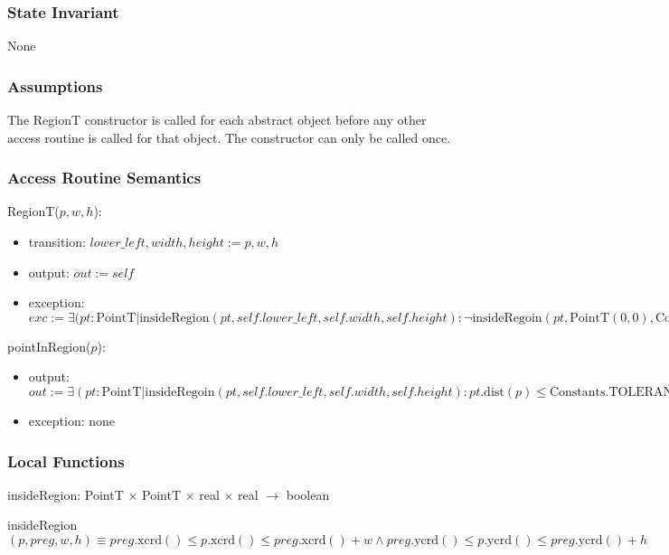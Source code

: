 \documentclass[12pt]{article}
\begin{document}
\subsubsection* {State Invariant}
None

\subsubsection* {Assumptions}
The RegionT constructor is called for each abstract object before any other access routine is called for that
object.  The constructor can only be called once.

\subsubsection* {Access Routine Semantics}

\noindent RegionT($p, w, h$):
\begin{itemize}
\item transition: $\mathit{lower\_left}, \mathit{width}, \mathit{height} := p, w, h$
\item output: $out := \mathit{self}$
\item exception: $exc := \exists ( pt: \mbox{PointT} | \mbox{insideRegion}(pt,self.lower\_left,self.width,self.height) : \neg \mbox{insideRegoin}(pt,\mbox{PointT}(0,0),\mbox{Constants.MAX\_X},\mbox{Constants.MAX\_Y}) \Rightarrow \mbox{InvalidRegionException}$
\end{itemize}

\noindent pointInRegion($p$):
\begin{itemize}
\item output: $\mathit{out} := \exists ( pt: \mbox{PointT} | \mbox{insideRegoin}(pt,self.lower\_left,self.width,self.height) : pt.\mbox{dist}(p) \leq \mbox{Constants.TOLERANCE})$
\item exception: none
\end{itemize}

\subsubsection*{Local Functions}
insideRegion: PointT $\times$ PointT $\times$ real $\times$ real $\rightarrow$ boolean

\noindent insideRegion$(p,preg,w,h) \equiv preg.\mbox{xcrd}() \leq p.\mbox{xcrd}() \leq preg.\mbox{xcrd}()+w \wedge preg.\mbox{ycrd}() \leq p.\mbox{ycrd}() \leq preg.\mbox{ycrd}()+h$

\newpage
\end{document}
